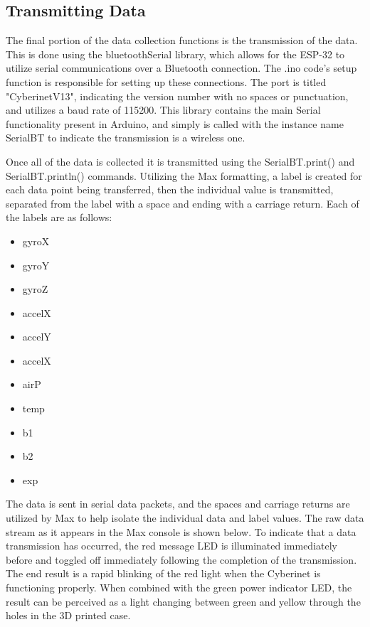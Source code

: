 \subsection{Transmitting Data}
The final portion of the data collection functions is the transmission of the data. This is done using the bluetoothSerial library, which allows for the ESP-32 to utilize serial communications over a Bluetooth connection. The .ino code's setup function is responsible for setting up these connections. The port is titled "CyberinetV13", indicating the version number with no spaces or punctuation, and utilizes a baud rate of 115200. This library contains the main Serial functionality present in Arduino, and simply is called with the instance name SerialBT to indicate the transmission is a wireless one.

Once all of the data is collected it is transmitted using the SerialBT.print() and SerialBT.println() commands. Utilizing the Max formatting, a label is created for each data point being transferred, then the individual value is transmitted, separated from the label with a space and ending with a carriage return. Each of the labels are as follows:

\begin{itemize}
    \item gyroX
    \item gyroY
    \item gyroZ
    \item accelX
    \item accelY
    \item accelX
    \item airP
    \item temp
    \item b1
    \item b2
    \item exp
\end{itemize}

The data is sent in serial data packets, and the spaces and carriage returns are utilized by Max to help isolate the individual data and label values. The raw data stream as it appears in the Max console is shown below. To indicate that a data transmission has occurred, the red message LED is illuminated immediately before and toggled off immediately following the completion of the transmission. The end result is a rapid blinking of the red light when the Cyberinet is functioning properly. When combined with the green power indicator LED, the result can be perceived as a light changing between green and yellow through the holes in the 3D printed case.

